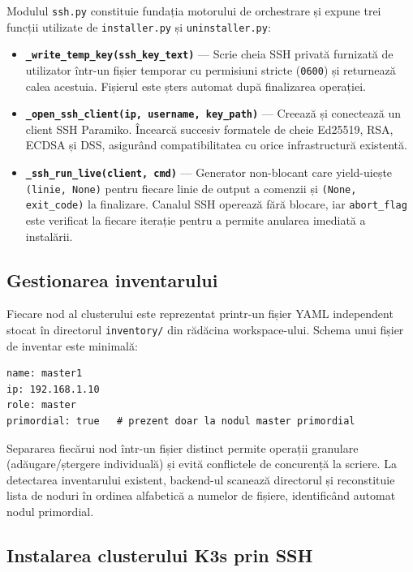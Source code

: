 \documentclass[12pt,a4paper]{report}
\begin{document}
Modulul \texttt{ssh.py} constituie fundația motorului de orchestrare și expune trei funcții utilizate de \texttt{installer.py} și \texttt{uninstaller.py}:

\begin{itemize}
  \item \textbf{\texttt{\_write\_temp\_key(ssh\_key\_text)}} — Scrie cheia SSH privată furnizată de utilizator într-un fișier temporar cu permisiuni stricte (\texttt{0600}) și returnează calea acestuia. Fișierul este șters automat după finalizarea operației.
  \item \textbf{\texttt{\_open\_ssh\_client(ip, username, key\_path)}} — Creează și conectează un client SSH Paramiko. Încearcă succesiv formatele de cheie Ed25519, RSA, ECDSA și DSS, asigurând compatibilitatea cu orice infrastructură existentă.
  \item \textbf{\texttt{\_ssh\_run\_live(client, cmd)}} — Generator non-blocant care yield-uiește \texttt{(linie, None)} pentru fiecare linie de output a comenzii și \texttt{(None, exit\_code)} la finalizare. Canalul SSH operează fără blocare, iar \texttt{abort\_flag} este verificat la fiecare iterație pentru a permite anularea imediată a instalării.
\end{itemize}

\subsection{Gestionarea inventarului}

Fiecare nod al clusterului este reprezentat printr-un fișier YAML independent stocat în directorul \texttt{inventory/} din rădăcina workspace-ului. Schema unui fișier de inventar este minimală:

\begin{verbatim}
name: master1
ip: 192.168.1.10
role: master
primordial: true   # prezent doar la nodul master primordial
\end{verbatim}

Separarea fiecărui nod într-un fișier distinct permite operații granulare (adăugare/ștergere individuală) și evită conflictele de concurență la scriere. La detectarea inventarului existent, backend-ul scanează directorul și reconstituie lista de noduri în ordinea alfabetică a numelor de fișiere, identificând automat nodul primordial.

\subsection{Instalarea clusterului K3s prin SSH}
\end{document}
